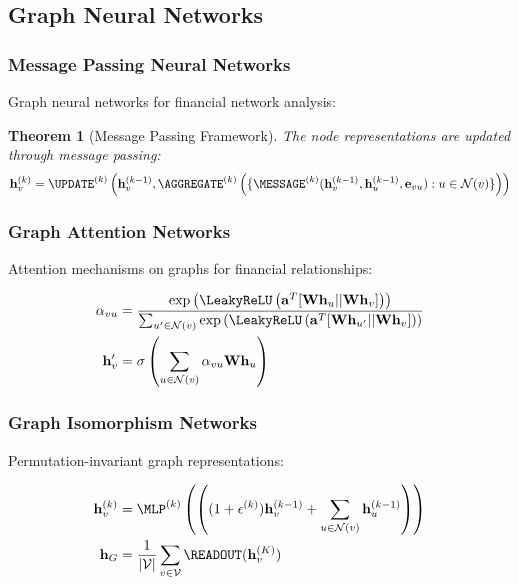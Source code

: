 \documentclass[11pt,letterpaper,openany]{book}
\newtheorem{theorem}{Theorem}[chapter]
\begin{document}
\subsection{Graph Neural Networks}

\subsubsection{Message Passing Neural Networks}

Graph neural networks for financial network analysis:

\begin{theorem}[Message Passing Framework]
The node representations are updated through message passing:
\[
\mathbf{h}_v^{(k)} = \UPDATE^{(k)}\left( \mathbf{h}_v^{(k-1)}, \AGGREGATE^{(k)}\left( \{\MESSAGE^{(k)}(\mathbf{h}_v^{(k-1)}, \mathbf{h}_u^{(k-1)}, \mathbf{e}_{vu}) : u \in \mathcal{N}(v)\} \right) \right)
\]
\end{theorem}

\subsubsection{Graph Attention Networks}

Attention mechanisms on graphs for financial relationships:

\begin{align}
\alpha_{vu} &= \frac{\exp\left( \LeakyReLU\left( \mathbf{a}^T [\mathbf{W} \mathbf{h}_u || \mathbf{W} \mathbf{h}_v] \right) \right)}{\sum_{u' \in \mathcal{N}(v)} \exp\left( \LeakyReLU\left( \mathbf{a}^T [\mathbf{W} \mathbf{h}_{u'} || \mathbf{W} \mathbf{h}_v] \right) \right)} \\
\mathbf{h}_v' &= \sigma\left( \sum_{u \in \mathcal{N}(v)} \alpha_{vu} \mathbf{W} \mathbf{h}_u \right)
\end{align}

\subsubsection{Graph Isomorphism Networks}

Permutation-invariant graph representations:

\begin{align}
\mathbf{h}_v^{(k)} &= \MLP^{(k)}\left( \left( (1 + \epsilon^{(k)}) \mathbf{h}_v^{(k-1)} + \sum_{u \in \mathcal{N}(v)} \mathbf{h}_u^{(k-1)} \right) \right) \\
\mathbf{h}_G &= \frac{1}{|\mathcal{V}|} \sum_{v \in \mathcal{V}} \READOUT(\mathbf{h}_v^{(K)})
\end{align}
\end{document}
